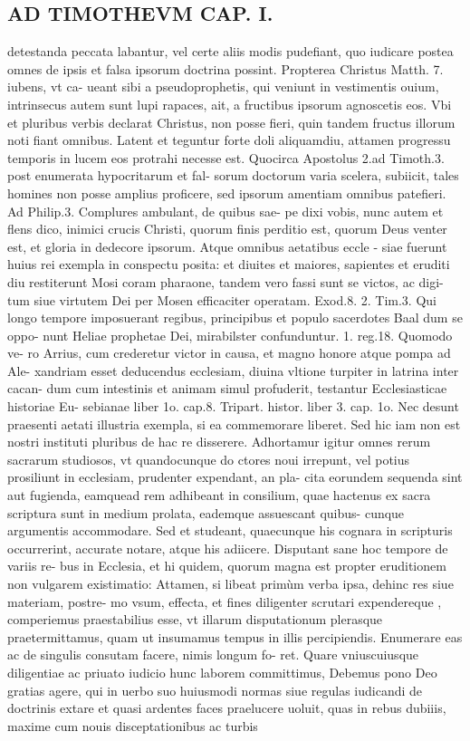 \documentclass{article}
\begin{document}
\begin{pages}
\section*{AD TIMOTHEVM CAP. I. }
\marginpar{[ p.20 ]}\pstart detestanda peccata labantur, vel certe aliis modis pudefiant, quo iudicare postea omnes de ipsis et falsa ipsorum doctrina possint. Propterea Christus Matth. 7. iubens, vt ca- ueant sibi a pseudoprophetis, qui veniunt in vestimentis ouium, intrinsecus autem sunt lupi rapaces, ait, a fructibus ipsorum agnoscetis eos. Vbi et pluribus verbis declarat Christus, non posse fieri, quin tandem fructus illorum noti fiant omnibus. Latent et teguntur forte doli aliquamdiu, attamen progressu temporis in lucem eos protrahi necesse est. Quocirca Apostolus 2.ad Timoth.3. post enumerata hypocritarum et fal- sorum doctorum varia scelera, subiicit, tales homines non posse amplius proficere, sed ipsorum amentiam omnibus patefieri. Ad Philip.3. Complures ambulant, de quibus sae-   pe dixi vobis, nunc autem et flens dico, inimici crucis Christi, quorum finis perditio est,   quorum Deus venter est, et gloria in dedecore ipsorum. Atque  omnibus aetatibus eccle -  siae fuerunt huius rei exempla in conspectu posita: et diuites et maiores, sapientes et eruditi diu restiterunt Mosi coram pharaone, tandem vero fassi sunt se victos, ac digi- tum siue virtutem Dei per Mosen efficaciter operatam. Exod.8. 2. Tim.3. Qui longo tempore imposuerant regibus, principibus et populo sacerdotes Baal dum se oppo- nunt Heliae prophetae Dei, mirabilster confunduntur. 1. reg.18. Quomodo ve- ro Arrius, cum crederetur victor in causa, et magno honore atque pompa ad Ale- xandriam esset deducendus ecclesiam, diuina vltione turpiter in latrina inter cacan- dum cum intestinis et animam simul profuderit, testantur Ecclesiasticae historiae Eu- sebianae liber 1o. cap.8. Tripart. histor. liber 3. cap. 1o. Nec desunt praesenti aetati illustria exempla, si ea commemorare liberet. Sed hic iam non est nostri instituti pluribus de hac re disserere. Adhortamur igitur omnes rerum sacrarum studiosos, vt quandocunque  do ctores noui irrepunt, vel potius prosiliunt in ecclesiam, prudenter expendant, an pla- cita eorundem sequenda sint aut fugienda, eamquead rem adhibeant in consilium, quae hactenus ex sacra scriptura sunt in medium prolata, eademque  assuescant quibus- cunque  argumentis accommodare. Sed et studeant, quaecunque  his cognara in scripturis occurrerint, accurate notare, atque  his adiicere. Disputant sane hoc tempore de variis re- bus in Ecclesia, et hi quidem, quorum magna est propter eruditionem non vulgarem existimatio: Attamen, si libeat primùm verba ipsa, dehinc res siue materiam, postre- mo vsum, effecta, et fines diligenter scrutari expendereque , comperiemus praestabilius esse, vt illarum disputationum plerasque  praetermittamus, quam ut insumamus tempus in illis percipiendis. Enumerare eas ac de singulis consutam facere, nimis longum fo- ret. Quare vniuscuiusque  diligentiae ac priuato iudicio hunc laborem committimus, Debemus pono Deo gratias agere, qui in uerbo suo huiusmodi normas siue regulas iudicandi de doctrinis extare et quasi ardentes faces praelucere uoluit, quas in rebus dubiiis, maxime cum nouis disceptationibus ac turbis 
\end{pages}
\end{document}
